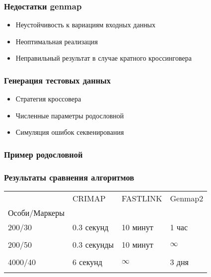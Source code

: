 \documentclass{beamer}
\begin{document}
\begin{frame}
  \frametitle{Недостатки genmap}
  \begin{itemize}
    \item Неустойчивость к вариациям входных данных
    \item Неоптимальная реализация
    \item Неправильный результат в случае кратного кроссинговера
  \end{itemize}
\end{frame}

\begin{frame}
  \frametitle{Генерация тестовых данных}
  \begin{itemize}
    \item Стратегия кроссовера
    \item Численные параметры родословной
    \item Симуляция ошибок секвенирования
  \end{itemize}
\end{frame}

\begin{frame}
  \frametitle{Пример родословной}

\end{frame}

\begin{frame}
  \frametitle{Результаты сравнения алгоритмов}


\begin{tabular}{|l|l|l|l|}
  \hline
  & CRIMAP & FASTLINK & Genmap2 \\
  Особи/Маркеры & & & \\
  \hline
  200/30 & 0.3 секунд & 10 минут & 1 час \\
  & & & \\
  \hline
  200/50 & 0.3 секунды & 10 минут & $ \infty $ \\
  & & & \\
  \hline
  4000/40 & 6 секунд & $ \infty $ & 3 дня \\
  & & & \\
  \hline
\end{tabular}

\end{frame}
\end{document}
